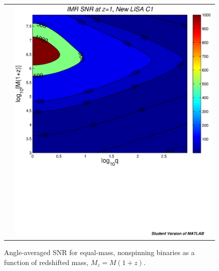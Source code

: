 \documentclass{iopart}
\begin{document}
\begin{figure}[H]
\begin{center}
\begin{tabular}{cc}
&\includegraphics[scale=0.41,clip=true]{FigEmanuele/C1IMRSNRContourz1.ps}\\
\end{tabular}
\caption{\label{fig:SNRMiniLISA2} Angle-averaged SNR for equal-mass,
  nonspinning binaries as a function of redshifted mass, $M_z=M(1+z)$.}
\end{center}
\end{figure}
%
\end{document}
